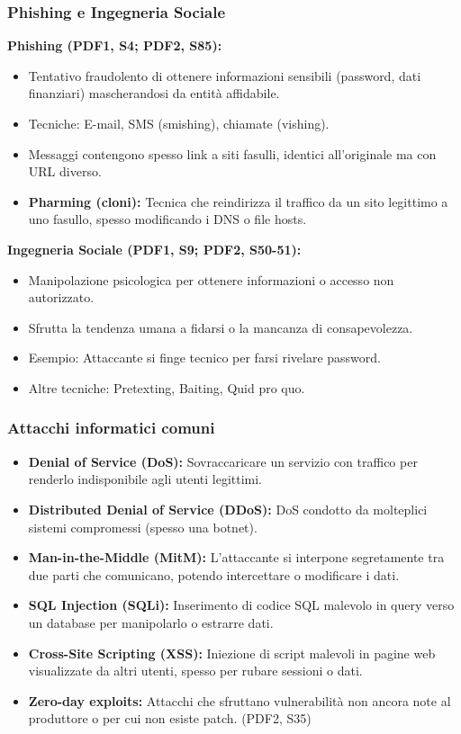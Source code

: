 \documentclass{beamer}
\begin{document}
\begin{frame}
  \frametitle{Phishing e Ingegneria Sociale}
  \textbf{Phishing (PDF1, S4; PDF2, S85):}
  \begin{itemize}
    \item Tentativo fraudolento di ottenere informazioni sensibili (password, dati finanziari) mascherandosi da entità affidabile.
    \item Tecniche: E-mail, SMS (smishing), chiamate (vishing).
    \item Messaggi contengono spesso link a siti fasulli, identici all'originale ma con URL diverso.
    \item \textbf{Pharming (cloni):} Tecnica che reindirizza il traffico da un sito legittimo a uno fasullo, spesso modificando i DNS o file hosts.
  \end{itemize}
  \pause
  \textbf{Ingegneria Sociale (PDF1, S9; PDF2, S50-51):}
  \begin{itemize}
    \item Manipolazione psicologica per ottenere informazioni o accesso non autorizzato.
    \item Sfrutta la tendenza umana a fidarsi o la mancanza di consapevolezza.
    \item Esempio: Attaccante si finge tecnico per farsi rivelare password.
    \item Altre tecniche: Pretexting, Baiting, Quid pro quo.
  \end{itemize}
\end{frame}

\begin{frame}
  \frametitle{Attacchi informatici comuni}
  \begin{itemize}
    \item \textbf{Denial of Service (DoS):} Sovraccaricare un servizio con traffico per renderlo indisponibile agli utenti legittimi.
    \item \textbf{Distributed Denial of Service (DDoS):} DoS condotto da molteplici sistemi compromessi (spesso una botnet).
    \item \textbf{Man-in-the-Middle (MitM):} L'attaccante si interpone segretamente tra due parti che comunicano, potendo intercettare o modificare i dati.
    \item \textbf{SQL Injection (SQLi):} Inserimento di codice SQL malevolo in query verso un database per manipolarlo o estrarre dati.
    \item \textbf{Cross-Site Scripting (XSS):} Iniezione di script malevoli in pagine web visualizzate da altri utenti, spesso per rubare sessioni o dati.
    \item \textbf{Zero-day exploits:} Attacchi che sfruttano vulnerabilità non ancora note al produttore o per cui non esiste patch. (PDF2, S35)
  \end{itemize}
\end{frame}
\end{document}
